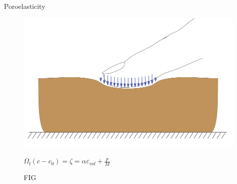 \documentclass[aspectratio=169,xcolor=dvipsnames]{beamer}
\begin{document}
\begin{frame}{Poroelasticity}
	
	\begin{figure}
		\begin{minipage}{\linewidth}
			\begin{minipage}{0.3\linewidth}\centering
				\includegraphics[width=\linewidth]{punch.pdf}
			\end{minipage}\hfill
			\begin{minipage}{0.3\linewidth}\centering

\tiny{$\Omega_{\mathrm{f}}\left(c-c_{0}\right)=\zeta=\alpha \varepsilon_{v o l}+\frac{p}{M}$}

			\end{minipage}\hfill
			\begin{minipage}{0.3\linewidth}\centering
FIG
			\end{minipage}
		\end{minipage}
	\end{figure}


\end{frame}
\end{document}
